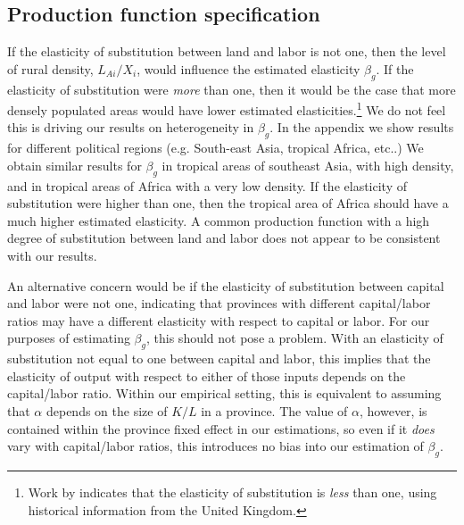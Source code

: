 \documentclass[11pt]{article}
\begin{document}
\subsection{Production function specification}
If the elasticity of substitution between land and labor is not one, then the level of rural density, $L_{Ai}/X_i$, would influence the estimated elasticity $\beta_g$. If the elasticity of substitution were \textit{more} than one, then it would be the case that more densely populated areas would have lower estimated elasticities.\footnote{Work by \citet{wilde2012} indicates that the elasticity of substitution is \textit{less} than one, using historical information from the United Kingdom.} We do not feel this is driving our results on heterogeneity in $\beta_g$. In the appendix we show results for different political regions (e.g. South-east Asia, tropical Africa, etc..) We obtain similar results for $\beta_g$ in tropical areas of southeast Asia, with high density, and in tropical areas of Africa with a very low density. If the elasticity of substitution were higher than one, then the tropical area of Africa should have a much higher estimated elasticity. A common production function with a high degree of substitution between land and labor does not appear to be consistent with our results.

An alternative concern would be if the elasticity of substitution between capital and labor were not one, indicating that provinces with different capital/labor ratios may have a different elasticity with respect to capital or labor. For our purposes of estimating $\beta_g$, this should not pose a problem. With an elasticity of substitution not equal to one between capital and labor, this implies that the elasticity of output with respect to either of those inputs depends on the capital/labor ratio. Within our empirical setting, this is equivalent to assuming that $\alpha$ depends on the size of $K/L$ in a province. The value of $\alpha$, however, is contained within the province fixed effect in our estimations, so even if it \textit{does} vary with capital/labor ratios, this introduces no bias into our estimation of $\beta_g$.
\end{document}
